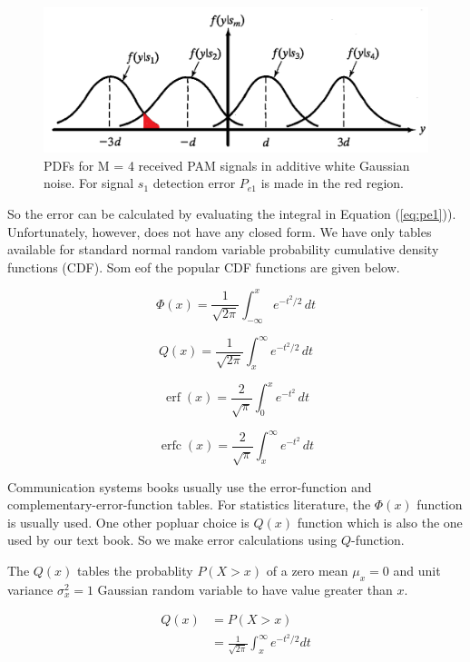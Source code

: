 \documentclass[a4paper]{article}
\numberwithin{equation}{subsection}
\begin{document}
	\begin{figure}
		\centering
		\includegraphics[width=\linewidth]{../figures/fig8_37}
		\caption{PDFs for M = 4 received PAM signals in additive white Gaussian noise. For signal $s_1$ detection error $P_{e1}$ is made in the red region.}
		\label{fig:fig837}
	\end{figure}
	
	
	So the error can be calculated by evaluating the integral in Equation (\ref{eq:pe1})). Unfortunately, however, does not have any closed form. We have only tables available for standard normal random variable  probability cumulative density functions (CDF). Som eof the popular CDF functions are given below.
	
	
	
	
	\[
	{\displaystyle \Phi (x)={\frac {1}{\sqrt {2\pi }}}\int _{-\infty }^{x}e^{-t^{2}/2}\,dt}
	\]
	
	
	\[
	{\displaystyle Q(x)={\frac{1}{\sqrt {2\pi }}}\int _{x}^{\infty}e^{-t^{2}/2}\,dt}
	\]
	
	
	\[
	{\displaystyle \operatorname {erf} (x)={\frac {2}{\sqrt {\pi }}}\int _{0}^{x}e^{-t^{2}}\,dt}
	\]
	
	\[
	{\displaystyle \operatorname {erfc} (x)={\frac {2}{\sqrt {\pi }}}\int _{x}^{\infty}e^{-t^{2}}\,dt}
	\]
	
	Communication systems books usually use the error-function and complementary-error-function tables. For statistics literature, the $\Phi(x)$ function is usually used. One other popluar choice is $Q(x)$ function which is also the one used by our text book. So we make error calculations using $Q$-function.
	
	The $Q(x)$ tables the probablity $P(X>x)$ of a zero mean $\mu_x=0$ and unit variance $\sigma_x^2=1$ Gaussian random variable to have value greater than $x$.
	
	\begin{equation}\label{key}
	\begin{aligned}
	Q(x)&=  P(X>x)\\
	&=\frac{1}{\sqrt{2\pi}} \int_x^\infty e^{-t^2/2} dt \\
	\end{aligned}
	\end{equation}
	
\end{document}

